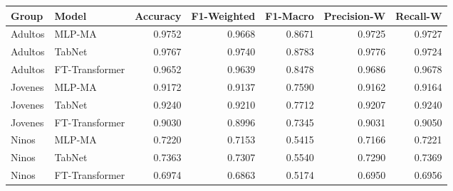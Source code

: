 \begin{tabular}{llrrrrr}
\toprule
Group & Model & Accuracy & F1-Weighted & F1-Macro & Precision-W & Recall-W \\
\midrule
Adultos & MLP-MA & 0.9752 & 0.9668 & 0.8671 & 0.9725 & 0.9727 \\
Adultos & TabNet & 0.9767 & 0.9740 & 0.8783 & 0.9776 & 0.9724 \\
Adultos & FT-Transformer & 0.9652 & 0.9639 & 0.8478 & 0.9686 & 0.9678 \\
Jovenes & MLP-MA & 0.9172 & 0.9137 & 0.7590 & 0.9162 & 0.9164 \\
Jovenes & TabNet & 0.9240 & 0.9210 & 0.7712 & 0.9207 & 0.9240 \\
Jovenes & FT-Transformer & 0.9030 & 0.8996 & 0.7345 & 0.9031 & 0.9050 \\
Ninos & MLP-MA & 0.7220 & 0.7153 & 0.5415 & 0.7166 & 0.7221 \\
Ninos & TabNet & 0.7363 & 0.7307 & 0.5540 & 0.7290 & 0.7369 \\
Ninos & FT-Transformer & 0.6974 & 0.6863 & 0.5174 & 0.6950 & 0.6956 \\
\bottomrule
\end{tabular}
